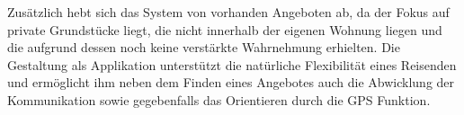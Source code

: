Zusätzlich hebt sich das System von vorhanden Angeboten ab, da der Fokus auf private Grundstücke liegt, die nicht innerhalb der eigenen Wohnung liegen und die aufgrund dessen noch keine verstärkte Wahrnehmung erhielten. Die Gestaltung als Applikation unterstützt die natürliche Flexibilität eines Reisenden und ermöglicht ihm neben dem Finden eines Angebotes auch die Abwicklung der Kommunikation sowie gegebenfalls das Orientieren durch die GPS Funktion. 

